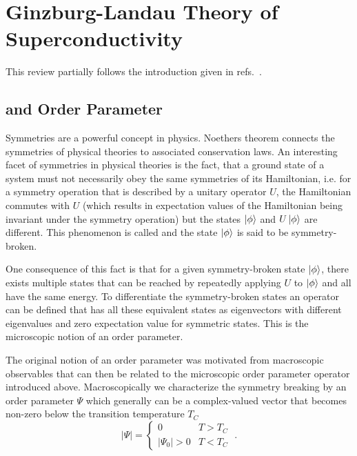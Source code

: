 \documentclass[../notes.tex]{subfiles}
\begin{document}
\section{Ginzburg-Landau Theory of Superconductivity}\label{sec:Ginzburg-Landau theory of superconductivity}


This review partially follows the introduction given in refs.~\cite{colemanIntroductionManyBodyPhysics2015, beekmanIntroductionSpontaneousSymmetry2019}.

\subsection{ and Order Parameter}

Symmetries are a powerful concept in physics.
Noethers theorem \cite{noetherInvarianteVariationsprobleme1918} connects the symmetries of physical theories to associated conservation laws.
An interesting facet of symmetries in physical theories is the fact, that a ground state of a system must not necessarily obey the same symmetries of its Hamiltonian, i.e. for a symmetry operation that is described by a unitary operator \(U\), the Hamiltonian commutes with \(U\) (which results in expectation values of the Hamiltonian being invariant under the symmetry operation) but the states \(\ket{\phi}\) and \(U \ket{\phi}\) are different.
This phenomenon is called  and the state \(\ket{\phi}\) is said to be symmetry-broken.

One consequence of this fact is that for a given symmetry-broken state \(\ket{\phi}\), there exists multiple states that can be reached by repeatedly applying \(U\) to \(\ket{\phi}\) and all have the same energy.
To differentiate the symmetry-broken states an operator can be defined that has all these equivalent states as eigenvectors with different eigenvalues and zero expectation value for symmetric states.
This is the microscopic notion of an order parameter.

The original notion of an order parameter was motivated from macroscopic observables that can then be related to the microscopic order parameter operator introduced above.
Macroscopically we characterize the symmetry breaking by an order parameter \(\Psi\) which generally can be a complex-valued vector that becomes non-zero below the transition temperature \(T_C\)
\begin{equation}
	\vert \Psi \vert =
	\begin{cases}
		0 & T > T_C \\
		\vert \Psi_0 \vert > 0 & T < T_C
	\end{cases} \;.
\end{equation}
\end{document}
